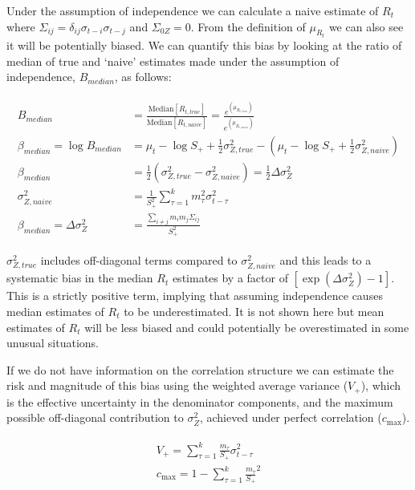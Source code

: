\documentclass[a4paper, 12pt, twoside]{article}
\begin{document}
Under the assumption of independence we can calculate a naive estimate of $R_t$ where $ \Sigma_{ij} = \delta_{ij} \sigma_{t-i} \sigma_{t-j} $ and $\Sigma_{0Z} = 0$. From the definition of $\mu_{R_t}$ we can also see it will be potentially biased. We can quantify this bias by looking at the ratio of median of true and `naive' estimates made under the assumption of independence, $B_{median}$, as follows:

\begin{eqnarray}
\begin{aligned}
B_{median} &= \frac{\text{Median}[R_{t,true}]}{\text{Median}[R_{t,naive}]} =
    \frac{
        e^{(\mu_{R_{t,true}})}
    }{
        e^{(\mu_{R_{t,naive}})}
    } \\
\beta_{median} =  \log B_{median} &=
    \mu_t - \log S_+ + \frac{1}{2}\sigma_{Z,true}^2  -
    (\mu_t - \log S_+ + \frac{1}{2}\sigma_{Z,naive}^2)\\
\beta_{median}  &= \frac{1}{2} ( \sigma_{Z,true}^2 - \sigma_{Z,naive}^2 )   = \frac{1}{2} \Delta \sigma_{Z}^2\\
\sigma_{Z,naive}^2 &= \frac{1}{S_+^2} \sum_{\tau=1}^k m_\tau^2 \sigma_{t-\tau}^2\\
\beta_{median} = \Delta \sigma_{Z}^2  &=  \frac{\sum_{i \ne j} m_i m_j \Sigma_{ij}}{S_+^2}
\end{aligned}
\end{eqnarray}




$ \sigma_{Z,true}^2 $ includes off-diagonal terms compared to $ \sigma_{Z,naive}^2 $ and this leads to a systematic bias in the median $ R_t $ estimates by a factor of $[\exp(\Delta \sigma_Z^2) - 1]$. This is a strictly positive term, implying that assuming independence causes median estimates of $ R_t $ to be underestimated. It is not shown here but mean estimates of $R_t$ will be less biased and could potentially be overestimated in some unusual situations.

If we do not have information on the correlation structure we can estimate the risk and magnitude of this bias using the weighted average variance ($V_+$), which is the effective uncertainty in the denominator components, and the maximum possible off-diagonal contribution to $ \sigma_Z^2 $, achieved under perfect correlation ($c_{\text{max}}$).

\begin{eqnarray}
\begin{aligned}
V_+ = \sum_{\tau=1}^k \frac{m_\tau}{S_+} \sigma_{t-\tau}^2\\
c_{\text{max}} = 1 - \sum_{\tau=1}^k \frac{m_\tau}{S_+}^2
\end{aligned}
\end{eqnarray}
\end{document}
